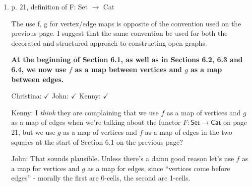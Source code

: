 \documentclass[reqno]{amsart}
\def\chris{\color{purple} Christina: }
\def\john{\color{red} John: }
\def\kenny{\color{blue} Kenny: }
\begin{document}
\begin{enumerate}
{Also, I'd better change the remark about  $\theta: EF \Rightarrow F'H$  on page 9, and
 in the statement of Theorem 2.5 --- these are two cases where we called it a ``natural 
isomorphism''.    I'll do this now: I'll change it to a ``natural transformation''.

I've thanked the referee profusely for catching this problem --- check out my response in boldface
above, and if you're happy, we can check this one off!}

{\chris The response looks great, see my small addition above. I seached ``isomorphism'' the whole document and I think we are fine (but perhaps 
Kenny can double check). Except this one place where I changed it to transformation above Theorem 2.5, check that it doesn't break anything? It looks 
OK to me.}


\item p. 21, definition of F: Set $\to$ Cat

The use f, g for vertex/edge maps is opposite of the convention used on the previous page. I suggest that the same convention be used for both the 
decorated and structured approach to constructing open graphs.

{\bf At the beginning of Section 6.1, as well as in Sections 6.2, 6.3 and 6.4, we now use $f$ as a map between vertices and $g$ as a map 
between edges.} 

{\chris $\checkmark$} {\john $\checkmark$} {\kenny  $\checkmark$}





\iffalse
{\kenny I \emph{think} they are complaining that we use $f$ as a map of vertices and $g$ as a map of edges when we're talking about the functor $F \colon \mathsf{Set} \to \mathsf{Cat}$ on page 21, but we use $g$ as a map of vertices and $f$ as a map of edges in the two squares at the start of Section 6.1 on the previous page?}

{\john That sounds plausible.  Unless there's a damn good reason let's use $f$ as a map for vertices and $g$ as a map for edges, since ``vertices come 
before edges'' - morally the first are 0-cells, the second are 1-cells.}


\end{enumerate}
\end{document}
